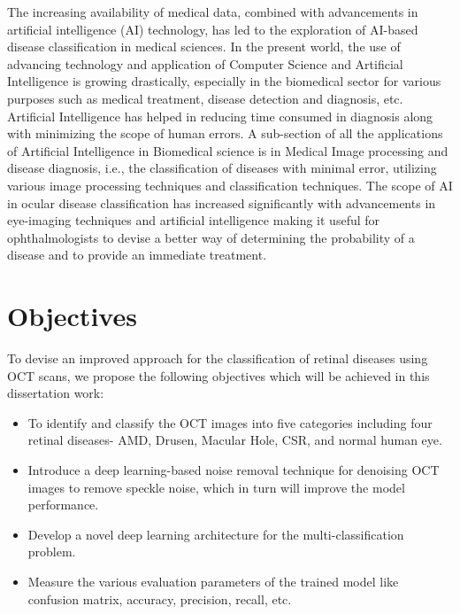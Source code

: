\par
The increasing availability of medical data, combined with advancements in artificial intelligence (AI) technology, has led to the exploration of AI-based disease classification in medical sciences. In the present world, the use of advancing technology and application of Computer Science and Artificial Intelligence is growing drastically, especially in the biomedical sector for various purposes such as medical treatment, disease detection and diagnosis, etc. Artificial Intelligence has helped in reducing time consumed in diagnosis along with minimizing the scope of human errors. A sub-section of all the applications of Artificial Intelligence in Biomedical science is in Medical Image processing and disease diagnosis, i.e., the classification of diseases with minimal error, utilizing various image processing techniques and classification techniques. The scope of AI in ocular disease classification has increased significantly with advancements in eye-imaging techniques and artificial intelligence making it useful for ophthalmologists to devise a better way of determining the probability of a disease and to provide an immediate treatment. 

\section{Objectives}
To devise an improved approach for the classification of retinal diseases using OCT scans, we propose the following objectives which will be achieved in this dissertation work:
\begin{itemize}
    \item To identify and classify the OCT images into five categories including four retinal diseases- AMD, Drusen, Macular Hole, CSR, and normal human eye.
    \item Introduce a deep learning-based noise removal technique for denoising OCT images to remove speckle noise, which in turn will improve the model performance.
    \item Develop a novel deep learning architecture for the multi-classification problem.
    \item Measure the various evaluation parameters of the trained model like confusion matrix, accuracy, precision, recall, etc.
\end{itemize}